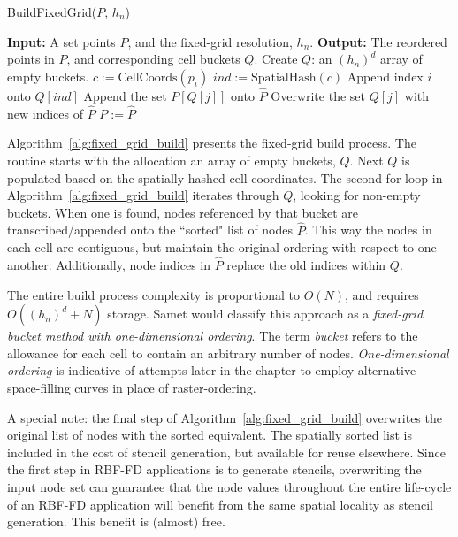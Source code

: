 \documentclass{report}
\begin{document}
\begin{algorithm} 
\caption{BuildFixedGrid($P$, $h_n$)}         
\label{alg:fixed_grid_build}  
\begin{algorithmic}[1]    
    \State \textbf{Input:} A set points $P$, and the fixed-grid resolution, $h_n$.
    \State \textbf{Output:} The reordered points in $P$, and corresponding cell buckets $Q$.
    \State
    \State Create $Q$: an $(h_n)^d$ array of empty buckets. 
       \State $c := \text{CellCoords}(p_i)$ 
       \State $ind := \text{SpatialHash}(c)$
       \State Append index $i$ onto $Q[ind]$
    \EndFor
        \State Append the set $P[Q[j]]$ onto $\hat{P}$
        \State Overwrite the set $Q[j]$ with new indices of $\hat{P}$ 
    \EndIf
    \EndFor
    \State $P := \hat{P}$
    \State \Return 
    \end{algorithmic}
\end{algorithm}

Algorithm~\ref{alg:fixed_grid_build} presents the fixed-grid build process. The routine starts with the allocation an array of empty buckets, $Q$. Next $Q$ is populated based on the spatially hashed cell coordinates. The second for-loop in Algorithm~\ref{alg:fixed_grid_build} iterates through $Q$, looking for non-empty buckets. When one is found, nodes referenced by that bucket are transcribed/appended onto the ``sorted" list of nodes $\hat{P}$. This way the nodes in each cell are contiguous, but maintain the original ordering with respect to one another. Additionally, node indices in $\hat{P}$ replace the old indices within $Q$.

The entire build process complexity is proportional to $O(N)$, and requires $O((h_n)^d + N)$ storage. Samet \cite{Samet2005} would classify this approach as a \emph{fixed-grid bucket method with one-dimensional ordering}. The term \emph{bucket} refers to the allowance for each cell to contain an arbitrary number of nodes. \emph{One-dimensional ordering} is indicative of attempts later in the chapter to employ alternative space-filling curves in place of raster-ordering. 

A special note: the final step of Algorithm~\ref{alg:fixed_grid_build} overwrites the original list of nodes with the sorted equivalent. The spatially sorted list is included in the cost of stencil generation, but available for reuse elsewhere. Since the first step in RBF-FD applications is to generate stencils, overwriting the input node set can guarantee that the node values throughout the entire life-cycle of an RBF-FD application will benefit from the same spatial locality as stencil generation. This benefit is (almost) free. 
\end{document}
